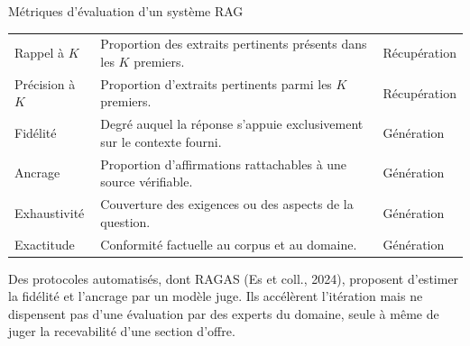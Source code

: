 \begin{btptable}{Métriques d'évaluation d'un système RAG}
\label{tab:metriques-rag}
\begin{tabularx}{\linewidth}{@{}L{3.2cm} Y L{3.4cm}@{}}
\toprule
{}
 &  &  \\
\midrule
Rappel à $K$ & Proportion des extraits pertinents présents dans les $K$ premiers. & Récupération \\
Précision à $K$ & Proportion d'extraits pertinents parmi les $K$ premiers. & Récupération \\
Fidélité & Degré auquel la réponse s'appuie exclusivement sur le contexte fourni. & Génération \\
Ancrage & Proportion d'affirmations rattachables à une source vérifiable. & Génération \\
Exhaustivité & Couverture des exigences ou des aspects de la question. & Génération \\
Exactitude & Conformité factuelle au corpus et au domaine. & Génération \\
\bottomrule
\end{tabularx}
\end{btptable}

Des protocoles automatisés, dont RAGAS (Es et coll., 2024), proposent
d'estimer la fidélité et l'ancrage par un modèle juge. Ils accélèrent
l'itération mais ne dispensent pas d'une évaluation par des experts du
domaine, seule à même de juger la recevabilité d'une section d'offre.
